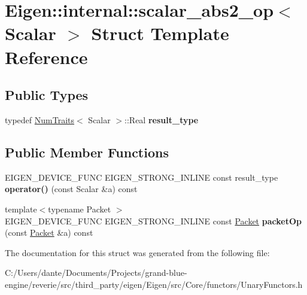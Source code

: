 \hypertarget{struct_eigen_1_1internal_1_1scalar__abs2__op}{}\section{Eigen\+::internal\+::scalar\+\_\+abs2\+\_\+op$<$ Scalar $>$ Struct Template Reference}
\label{struct_eigen_1_1internal_1_1scalar__abs2__op}
\subsection*{Public Types}
\begin{DoxyCompactItemize}
\item 
\mbox{\label{struct_eigen_1_1internal_1_1scalar__abs2__op_a8a20e6a78a8d74957a7d93c124f7714d}} 
typedef \mbox{\hyperlink{struct_eigen_1_1_num_traits}{Num\+Traits}}$<$ Scalar $>$\+::Real {\bfseries result\+\_\+type}
\end{DoxyCompactItemize}
\subsection*{Public Member Functions}
\begin{DoxyCompactItemize}
\item 
\mbox{\label{struct_eigen_1_1internal_1_1scalar__abs2__op_a7f0176339ccb73b9ea97a8871237f5c6}} 
E\+I\+G\+E\+N\+\_\+\+D\+E\+V\+I\+C\+E\+\_\+\+F\+U\+NC E\+I\+G\+E\+N\+\_\+\+S\+T\+R\+O\+N\+G\+\_\+\+I\+N\+L\+I\+NE const result\+\_\+type {\bfseries operator()} (const Scalar \&a) const
\item 
\mbox{\label{struct_eigen_1_1internal_1_1scalar__abs2__op_aa33487affb7a7b6395ba0c475c0e548e}} 
{\footnotesize template$<$typename Packet $>$ }\\E\+I\+G\+E\+N\+\_\+\+D\+E\+V\+I\+C\+E\+\_\+\+F\+U\+NC E\+I\+G\+E\+N\+\_\+\+S\+T\+R\+O\+N\+G\+\_\+\+I\+N\+L\+I\+NE const \mbox{\hyperlink{union_eigen_1_1internal_1_1_packet}{Packet}} {\bfseries packet\+Op} (const \mbox{\hyperlink{union_eigen_1_1internal_1_1_packet}{Packet}} \&a) const
\end{DoxyCompactItemize}


The documentation for this struct was generated from the following file\+:\begin{DoxyCompactItemize}
\item 
C\+:/\+Users/dante/\+Documents/\+Projects/grand-\/blue-\/engine/reverie/src/third\+\_\+party/eigen/\+Eigen/src/\+Core/functors/Unary\+Functors.\+h\end{DoxyCompactItemize}
